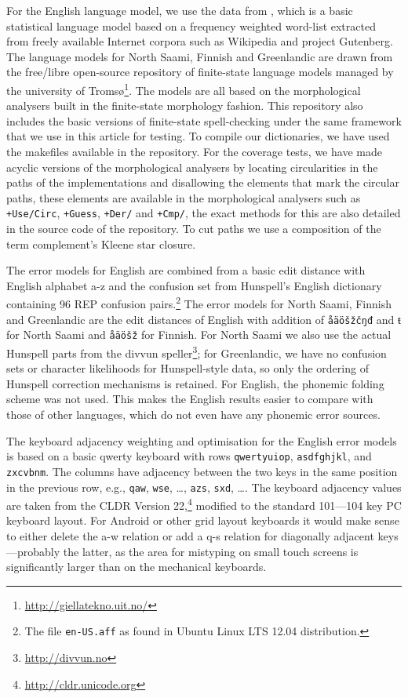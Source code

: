 \documentclass[a4paper,12pt]{article}
\begin{document}
For the English language model, we use the data from
\cite{norvig/2010,pirinen2012effects}, which is a basic statistical language
model based on a frequency weighted word-list extracted from freely available
Internet corpora such as Wikipedia and project Gutenberg. The language models for
North Saami, Finnish and Greenlandic are drawn from the free/libre open-source
repository of finite-state language models managed by the university of
Tromsø\footnote{\url{http://giellatekno.uit.no/}}. The models are all based on
the morphological analysers built in the finite-state morphology
\cite[]{beesley2003finite} fashion. This repository also includes the basic
versions of finite-state spell-checking under the same framework that we use in
this article for testing. To compile our dictionaries, we have used the
makefiles available in the repository. For the coverage tests, we have made
acyclic versions of the morphological analysers by locating circularities
in the paths of the implementations and disallowing the elements that mark the
circular paths, these elements are available in the morphological analysers
such as \texttt{+Use/Circ}, \texttt{+Guess}, \texttt{+Der/} and \texttt{+Cmp/},
the exact methods for this are also detailed in the source code of the
repository. To cut paths we use a composition of the term complement's Kleene
star closure.

The error models for English are combined from a basic edit distance with
English alphabet a-z and the confusion set from Hunspell's English dictionary
containing 96 REP confusion pairs.\footnote{The file \texttt{en-US.aff} as found
in Ubuntu Linux LTS 12.04 distribution.} The error models for North Saami,
Finnish and Greenlandic are the edit distances of English with addition of
\texttt{åäöšžčŋđ} and { ŧ}
for North Saami and \texttt{åäöšž} for Finnish. For North
Saami we also use the actual Hunspell parts from the divvun
speller\footnote{\url{http://divvun.no}}; for Greenlandic, we have no confusion
sets or character likelihoods for Hunspell-style data, so only the ordering of
Hunspell correction mechanisms is retained.
 For English, the phonemic folding scheme was not used. This makes the
English results easier to compare with those of other languages, which do not
even have any phonemic error sources.

The keyboard adjacency weighting and optimisation for the English error models
is based on a basic qwerty keyboard with rows \texttt{qwertyuiop},
\texttt{asdfghjkl}, and \texttt{zxcvbnm}. The columns have adjacency between
the two keys in the same position in the previous row, e.g., \texttt{qaw},
\texttt{wse}, \ldots, \texttt{azs}, \texttt{sxd}, \ldots. The keyboard
adjacency values are taken from the CLDR Version
22,\footnote{\url{http://cldr.unicode.org}} modified to the standard 101---104
key PC keyboard layout. For Android or other grid layout keyboards it would
make sense to either delete the a-w relation or add a q-s relation for
diagonally adjacent keys---probably the latter, as the area for mistyping on
small touch screens is significantly larger than on the mechanical keyboards.
\end{document}
